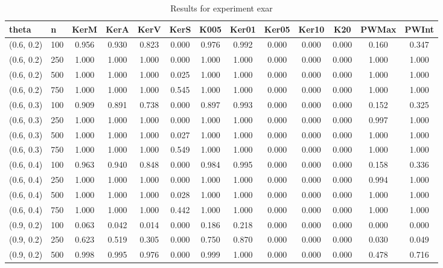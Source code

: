 \begin{table}[ht]
	\centering
	
	\caption{Results for experiment exar}
	\tiny{
		\begin{tabular}{ll|ccccccccccc}
			\hline
			theta & n & KerM & KerA & KerV & KerS & K005 & Ker01 & Ker05 & Ker10 & K20 & PWMax & PWInt \\
			\hline
			(0.6, 0.2) & 100 & 0.956 & 0.930 & 0.823 & 0.000 & 0.976 & 0.992 & 0.000 & 0.000 & 0.000 & 0.160 & 0.347 \\
			(0.6, 0.2) & 250 & 1.000 & 1.000 & 1.000 & 0.000 & 1.000 & 1.000 & 0.000 & 0.000 & 0.000 & 1.000 & 1.000 \\
			(0.6, 0.2) & 500 & 1.000 & 1.000 & 1.000 & 0.025 & 1.000 & 1.000 & 0.000 & 0.000 & 0.000 & 1.000 & 1.000 \\
			(0.6, 0.2) & 750 & 1.000 & 1.000 & 1.000 & 0.545 & 1.000 & 1.000 & 0.000 & 0.000 & 0.000 & 1.000 & 1.000 \\
			(0.6, 0.3) & 100 & 0.909 & 0.891 & 0.738 & 0.000 & 0.897 & 0.993 & 0.000 & 0.000 & 0.000 & 0.152 & 0.325 \\
			(0.6, 0.3) & 250 & 1.000 & 1.000 & 1.000 & 0.000 & 1.000 & 1.000 & 0.000 & 0.000 & 0.000 & 0.997 & 1.000 \\
			(0.6, 0.3) & 500 & 1.000 & 1.000 & 1.000 & 0.027 & 1.000 & 1.000 & 0.000 & 0.000 & 0.000 & 1.000 & 1.000 \\
			(0.6, 0.3) & 750 & 1.000 & 1.000 & 1.000 & 0.549 & 1.000 & 1.000 & 0.000 & 0.000 & 0.000 & 1.000 & 1.000 \\
			(0.6, 0.4) & 100 & 0.963 & 0.940 & 0.848 & 0.000 & 0.984 & 0.995 & 0.000 & 0.000 & 0.000 & 0.158 & 0.336 \\
			(0.6, 0.4) & 250 & 1.000 & 1.000 & 1.000 & 0.000 & 1.000 & 1.000 & 0.000 & 0.000 & 0.000 & 0.994 & 1.000 \\
			(0.6, 0.4) & 500 & 1.000 & 1.000 & 1.000 & 0.028 & 1.000 & 1.000 & 0.000 & 0.000 & 0.000 & 1.000 & 1.000 \\
			(0.6, 0.4) & 750 & 1.000 & 1.000 & 1.000 & 0.442 & 1.000 & 1.000 & 0.000 & 0.000 & 0.000 & 1.000 & 1.000 \\
			(0.9, 0.2) & 100 & 0.063 & 0.042 & 0.014 & 0.000 & 0.186 & 0.218 & 0.000 & 0.000 & 0.000 & 0.000 & 0.000 \\
			(0.9, 0.2) & 250 & 0.623 & 0.519 & 0.305 & 0.000 & 0.750 & 0.870 & 0.000 & 0.000 & 0.000 & 0.030 & 0.049 \\
			(0.9, 0.2) & 500 & 0.998 & 0.995 & 0.976 & 0.000 & 0.999 & 1.000 & 0.000 & 0.000 & 0.000 & 0.478 & 0.716 \\

\end{tabular}}
\end{table}
